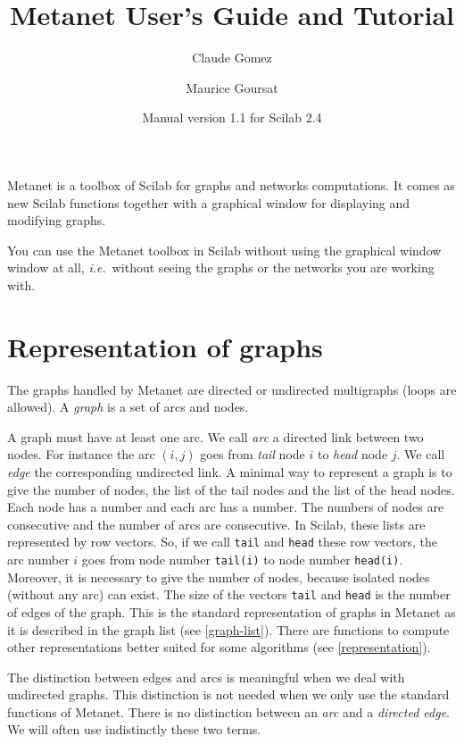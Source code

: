 \documentclass[11pt]{article}
\title{Metanet User's Guide and Tutorial}
\author{Claude Gomez \and Maurice Goursat}
\date{Manual version 1.1 for Scilab 2.4}
\newcommand{\ie}{\hbox{\textit{i.e.}}\ }
\begin{document}
\maketitle

Metanet is a toolbox of Scilab for graphs and networks computations.
It comes as new
Scilab functions together with a graphical
window for displaying and modifying graphs.

You can use the Metanet toolbox in Scilab without using the graphical window
window at all,
\ie without seeing the graphs or the networks you are working with.

\section{Representation of graphs}

The graphs handled by Metanet are directed or undirected multigraphs 
(loops are allowed).
A \emph{graph}
is a set of arcs and nodes. 

A graph must have at least one arc. 
We call \emph{arc} a directed link between two nodes. 
For instance the arc $(i,j)$ goes from \emph{tail}
node $i$ to \emph{head}
node $j$. 
We call \emph{edge} the 
corresponding undirected link. A minimal way to represent a graph is to
give the number of nodes, the list of the tail nodes and the list of the
head nodes. Each node has a number and each arc has a number. The numbers
of nodes are consecutive and the number of arcs are consecutive. In Scilab,
these lists are represented by row vectors. So, if we call \texttt{tail} and
\texttt{head} these row vectors, the arc number $i$ goes from node
number \texttt{tail(i)} to node number \texttt{head(i)}. Moreover, 
it is necessary to give the number of
nodes, because isolated nodes  
(without any arc) can exist. The
size of the vectors \texttt{tail} and \texttt{head} is the number of
edges of the graph. This is the standard representation of graphs in
Metanet as it is described in the graph list (see \ref{graph-list}).
There are functions to compute other representations better suited for
some algorithms (see \ref{representation}).

The distinction between edges and arcs is meaningful when
we 
deal with
undirected graphs. This distinction is not needed when we
only use the standard functions of Metanet. There is no distinction
between an \emph{arc} and a \emph{directed edge}. 
We will often use indistinctly
these two terms.
\end{document}

